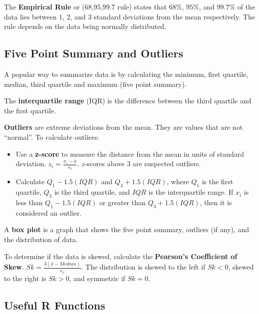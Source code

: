 \documentclass[
  letterpaper,
  DIV=11,
  numbers=noendperiod]{scrreprt}
\begin{document}
The \textbf{Empirical Rule} or (\(68\),\(95\),\(99.7\) rule) states that
\(68\)\%, \(95\)\%, and \(99.7\)\% of the data lies between \(1\),
\(2\), and \(3\) standard deviations from the mean respectively. The
rule depends on the data being normally distributed.

\hypertarget{five-point-summary-and-outliers}{%
\subsection*{Five Point Summary and
Outliers}\label{five-point-summary-and-outliers}}

A popular way to summarize data is by calculating the minimum, first
quartile, median, third quartile and maximum (five point summary).

The \textbf{interquartile range} (IQR) is the difference between the
third quartile and the first quartile.

\textbf{Outliers} are extreme deviations from the mean. They are values
that are not ``normal''. To calculate outliers:

\begin{itemize}
\item
  Use a \textbf{z-score} to measure the distance from the mean in units
  of standard deviation. \(z_{i}=\frac{x_i-\bar{x}}{s_x}\). \(z\)-scores
  above \(3\) are suspected outliers.
\item
  Calculate \(Q_1-1.5(IQR)\) and \(Q_3+1.5(IQR)\), where \(Q_1\) is the
  first quartile, \(Q_3\) is the third quartile, and \(IQR\) is the
  interquartile range. If \(x_i\) is less than \(Q_1-1.5(IQR)\) or
  greater than \(Q_3+1.5(IQR)\), then it is considered an outlier.
\end{itemize}

A \textbf{box plot} is a graph that shows the five point summary,
outliers (if any), and the distribution of data.

To determine if the data is skewed, calculate the \textbf{Pearson's
Coefficient of Skew}. \(Sk=\frac{3(\bar {x}- Median)}{s_x}\). The
distribution is skewed to the left if \(Sk<0\), skewed to the right is
\(Sk>0\), and symmetric if \(Sk=0\).

\hypertarget{useful-r-functions-4}{%
\subsection*{Useful R Functions}\label{useful-r-functions-4}}
\end{document}
